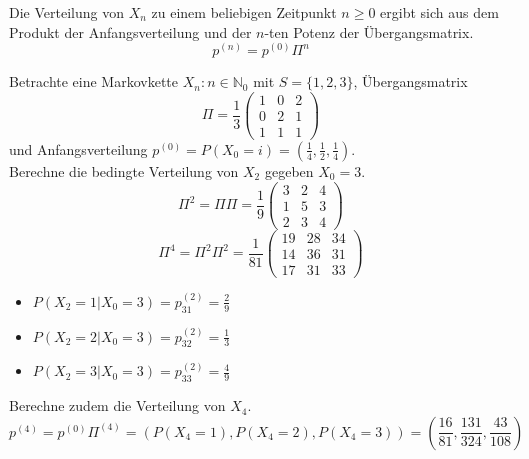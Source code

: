\documentclass[a4paper,12pt]{article}
\begin{document}
\begin{tcolorbox}[breakable, colframe=green, colback=white, title=Satz 9]
	Die Verteilung von $X_n$ zu einem beliebigen Zeitpunkt $n \geq 0$ ergibt sich aus dem Produkt der Anfangsverteilung
	und der $n$-ten Potenz der Übergangsmatrix.
	$$
		p^{(n)} = p^{(0)} \Pi^n
	$$
\end{tcolorbox}


\begin{tcolorbox}[breakable, colframe=blue, colback=white, title=Beispiel 8]
	Betrachte eine Markovkette ${X_n: n \in \mathbb{N}_0}$ mit $S= \{1, 2, 3\}$, Übergangsmatrix
	$$
		\Pi = \frac{1}{3}\begin{pmatrix}
			1 & 0 & 2 \\
			0 & 2 & 1 \\
			1 & 1 & 1
		\end{pmatrix}
	$$
	und Anfangsverteilung $p^{(0)} = P(X_0 = i) = \left(\frac{1}{4}, \frac{1}{2}, \frac{1}{4}\right)$.\\
	Berechne die bedingte Verteilung von $X_2$ gegeben $X_0 = 3$.
	$$
		\Pi^2 = \Pi\Pi = \frac{1}{9} \begin{pmatrix}
			3 & 2 & 4 \\
			1 & 5 & 3 \\
			2 & 3 & 4
		\end{pmatrix}
	$$
	$$
		\Pi^4 = \Pi^2\Pi^2 = \frac{1}{81} \begin{pmatrix}
			19 & 28 & 34 \\
			14 & 36 & 31 \\
			17 & 31 & 33
		\end{pmatrix}
	$$
	\begin{itemize}
		\item $P(X_2 = 1 | X_0 = 3) = p_{31}^{(2)} = \frac{2}{9}$
		\item $P(X_2 = 2 | X_0 = 3) = p_{32}^{(2)} = \frac{1}{3}$
		\item $P(X_2 = 3 | X_0 = 3) = p_{33}^{(2)} = \frac{4}{9}$
	\end{itemize}
	Berechne zudem die Verteilung von $X_4$.
	$$
		p^{(4)} = p^{(0)}\Pi^{(4)} = \left(P(X_4 = 1), P(X_4 = 2), P(X_4 = 3)\right)=  \left(\frac{16}{81}, \frac{131}{324}, \frac{43}{108}\right)
	$$
\end{tcolorbox}
\end{document}
